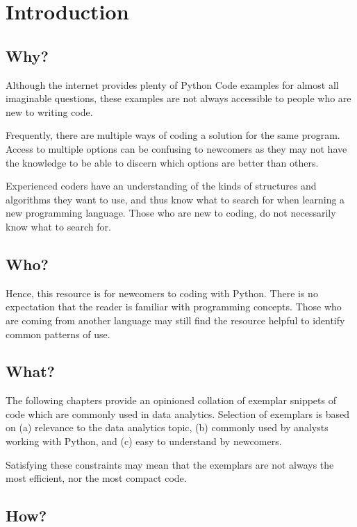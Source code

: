 
\chapter{Introduction}
\label{chapter:introduction}

\section{Why?}

Although the internet provides plenty of Python Code examples for almost all imaginable questions, these examples are not always accessible to people who are new to writing code.

Frequently, there are multiple ways of coding a solution for the same program. Access to multiple options can be confusing to newcomers as they may not have the knowledge to be able to discern which options are better than others.

Experienced coders have an understanding of the kinds of structures and algorithms they want to use, and thus know what to search for when learning a new programming language. Those who are new to coding, do not necessarily know what to search for.

\section{Who?}

Hence, this resource is for newcomers to coding with Python. There is no expectation that the reader is familiar with programming concepts. Those who are coming from another language may still find the resource helpful to identify common patterns of use.

\section{What?}

The following chapters provide an opinioned collation of exemplar snippets of code which are commonly used in data analytics. Selection of exemplars is based on (a) relevance to the data analytics topic, (b) commonly used by analysts working with Python, and (c) easy to understand by newcomers.

Satisfying these constraints may mean that the exemplars are not always the most efficient, nor the most compact code.

\section{How?}

